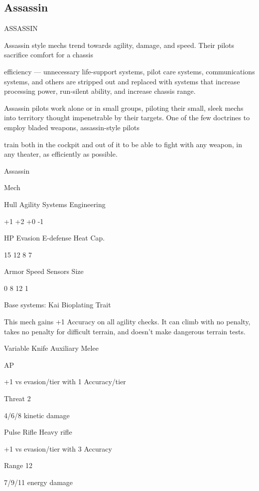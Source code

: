 \subsection{Assassin}

                                                 ASSASSIN

Assassin style mechs trend towards agility, damage, and speed. Their pilots sacrifice comfort for a chassis

efficiency — unnecessary life-support systems, pilot care systems, communications systems, and others
are stripped out and replaced with systems that increase processing power, run-silent ability, and increase
chassis range.

Assassin pilots work alone or in small groups, piloting their small, sleek mechs into territory thought
impenetrable by their targets. One of the few doctrines to employ bladed weapons, assassin-style pilots

train both in the cockpit and out of it to be able to fight with any weapon, in any theater, as efficiently as
possible.

 Assassin

 Mech

 Hull        Agility      Systems        Engineering

 +1          +2           +0             -1

 HP          Evasion      E-defense      Heat Cap.

  15         12           8              7

 Armor       Speed        Sensors       Size

 0           8            12             1

Base systems:
Kai Bioplating
Trait

This mech gains +1 Accuracy on all agility checks. It can climb with no penalty, takes no penalty
for difficult terrain, and doesn't make dangerous terrain tests.


Variable Knife
Auxiliary Melee

AP

+1 vs evasion/tier with 1 Accuracy/tier

Threat 2

4/6/8 kinetic damage


Pulse Rifle
Heavy rifle

+1 vs evasion/tier with 3 Accuracy

Range 12

7/9/11 energy damage





